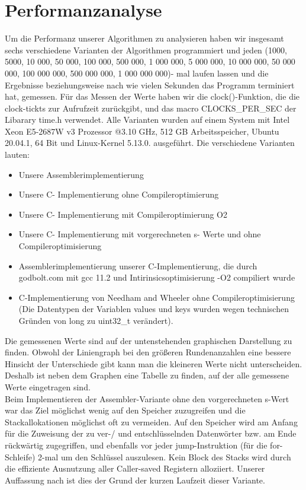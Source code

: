 \documentclass[course=asp]{aspdoc}
\begin{document}
\section{Performanzanalyse}
Um die Performanz unserer Algorithmen zu analysieren haben wir insgesamt sechs verschiedene Varianten der Algorithmen programmiert und jeden (1000, 5000, 10 000, 50 000, 100 000, 500 000, 1 000 000, 5 000 000, 10 000 000, 50 000 000, 100 000 000, 500 000 000, 1 000 000 000)- mal laufen lassen und die Ergebnisse beziehungsweise nach wie vielen Sekunden das Programm terminiert hat, gemessen. Für das Messen der Werte haben wir die clock()-Funktion, die die clock-tickts zur Aufrufzeit zurückgibt, und das macro CLOCKS\_PER\_SEC der Libarary time.h verwendet. Alle Varianten wurden auf einem System mit Intel Xeon E5-2687W v3 Prozessor @3.10 GHz, 512 GB Arbeitsspeicher, Ubuntu 20.04.1, 64 Bit und Linux-Kernel 5.13.0. ausgeführt. Die verschiedene Varianten lauten:
\begin{itemize}
\item Unsere Assemblerimplementierung
\item Unsere C- Implementierung ohne Compileroptimierung
\item Unsere C- Implementierung mit Compileroptimierung O2
\item Unsere C- Implementierung mit vorgerechneten s- Werte und ohne Compileroptimisierung
\item Assemblerimplementierung unserer C-Implementierung, die durch godbolt.com mit gcc 11.2 und Intirinsicsoptimisierung -O2 compiliert wurde
\item C-Implementierung von Needham and Wheeler ohne Compileroptimisierung (Die Datentypen der Variablen values und keys wurden wegen technischen Gründen von long zu uint32\_t verändert).
\end{itemize}
Die gemessenen Werte sind auf der untenstehenden graphischen Darstellung zu finden. Obwohl der Liniengraph bei den größeren Rundenanzahlen eine bessere Hinsicht der Unterschiede gibt kann man die kleineren Werte nicht unterscheiden. Deshalb ist neben dem Graphen eine Tabelle zu finden, auf der alle gemessene Werte eingetragen sind.\\
Beim Implementieren der Assembler-Variante ohne den vorgerechneten s-Wert war das Ziel möglichst wenig auf den Speicher zuzugreifen und die Stackallokationen möglichst oft zu vermeiden. Auf den Speicher wird am Anfang für die Zuweisung der zu ver-/ und entschlüsselnden Datenwörter bzw. am Ende rückwärtig zugegriffen, und ebenfalls vor jeder jump-Instruktion (für die for-Schleife) 2-mal um den Schlüssel auszulesen. Kein Block des Stacks wird durch die effiziente Ausnutzung aller Caller-saved Registern alloziiert. Unserer Auffassung nach ist dies der Grund der kurzen Laufzeit dieser Variante.
\end{document}
